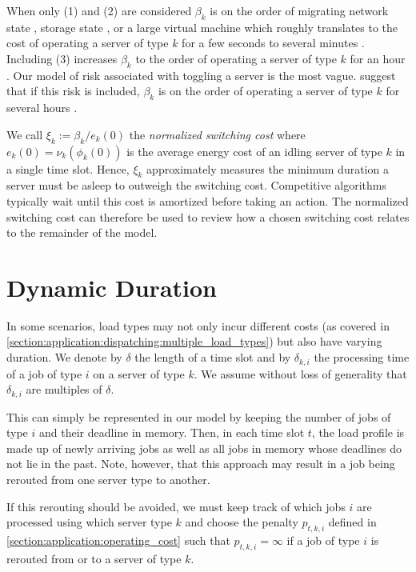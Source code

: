 When only (1) and (2) are considered $\beta_k$ is on the order of migrating network state \cite{Chen2008}, storage state \cite{Thereska2009}, or a large virtual machine \cite{Clark2005} which roughly translates to the cost of operating a server of type $k$ for a few seconds to several minutes \cite{Lin2011}. Including (3) increases $\beta_k$ to the order of operating a server of type $k$ for an hour \cite{Bodik2008}. Our model of risk associated with toggling a server is the most vague. \citeauthor*{Lin2011} suggest that if this risk is included, $\beta_k$ is on the order of operating a server of type $k$ for several hours \cite{Lin2011}.

We call $\xi_k := \beta_k / e_k(0)$ the \emph{normalized switching cost} where $e_k(0) = \nu_k(\phi_k(0))$ is the average energy cost of an idling server of type $k$ in a single time slot. Hence, $\xi_k$ approximately measures the minimum duration a server must be asleep to outweigh the switching cost. Competitive algorithms typically wait until this cost is amortized before taking an action. The normalized switching cost can therefore be used to review how a chosen switching cost relates to the remainder of the model.

\section{Dynamic Duration}\label{section:application:dynamic_duration}

In some scenarios, load types may not only incur different costs (as covered in \autoref{section:application:dispatching:multiple_load_types}) but also have varying duration. We denote by $\delta$ the length of a time slot and by $\delta_{k,i}$ the processing time of a job of type $i$ on a server of type $k$. We assume without loss of generality that $\delta_{k,i}$ are multiples of $\delta$.

This can simply be represented in our model by keeping the number of jobs of type $i$ and their deadline in memory. Then, in each time slot $t$, the load profile is made up of newly arriving jobs as well as all jobs in memory whose deadlines do not lie in the past. Note, however, that this approach may result in a job being rerouted from one server type to another.

If this rerouting should be avoided, we must keep track of which jobs $i$ are processed using which server type $k$ and choose the penalty $p_{t,k,i}$ defined in \autoref{section:application:operating_cost} such that $p_{t,k,i} = \infty$ if a job of type $i$ is rerouted from or to a server of type $k$.

